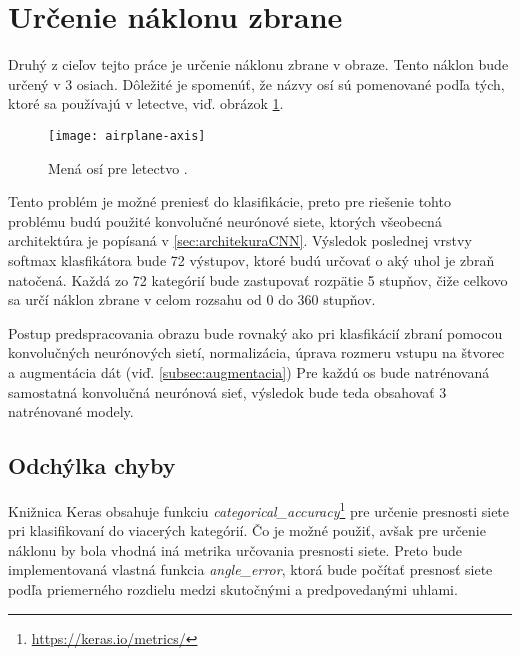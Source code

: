 
\section{Určenie náklonu zbrane}
\label{sec:urcenienaklonuzbrane}
Druhý z cieľov tejto práce je určenie náklonu zbrane v obraze.
Tento náklon bude určený v 3 osiach.
Dôležité je spomenúť, že názvy osí sú pomenované podľa tých, ktoré sa používajú v letectve, viď. obrázok \ref{pic:airplaneaxis}.
\begin{figure}[H]
    \centering
    \texttt{[image: airplane-axis]}
    \caption{Mená osí pre letectvo \cite{odkaz:airplaneaxis}.}
    \label{pic:airplaneaxis}
\end{figure}

Tento problém je možné preniesť do klasifikácie, preto pre riešenie tohto problému budú použité konvolučné neurónové siete, ktorých všeobecná architektúra je popísaná v \ref{sec:architekuraCNN}.
Výsledok poslednej vrstvy softmax klasfikátora bude 72 výstupov, ktoré budú určovať o aký uhol je zbraň natočená.
Každá zo 72 kategórií bude zastupovať rozpätie 5 stupňov, čiže celkovo sa určí náklon zbrane v celom rozsahu od 0 do 360 stupňov.

Postup predspracovania obrazu bude rovnaký ako pri klasfikácií zbraní pomocou konvolučných neurónových sietí, normalizácia, úprava rozmeru vstupu na štvorec a augmentácia dát (viď. \ref{subsec:augmentacia})
Pre každú os bude natrénovaná samostatná konvolučná neurónová sieť, výsledok bude teda obsahovať 3 natrénované modely.

\subsection{Odchýlka chyby}
\label{subsec:odchylkachyby}
Knižnica Keras obsahuje funkciu \textit{categorical\_accuracy}\footnote{\url{https://keras.io/metrics/}} pre určenie presnosti siete pri klasifikovaní do viacerých kategórií.
Čo je možné použiť, avšak pre určenie náklonu by bola vhodná iná metrika určovania presnosti siete.
Preto bude implementovaná vlastná funkcia \textit{angle\_error}, ktorá bude počítať presnosť siete podľa priemerného rozdielu medzi skutočnými a predpovedanými uhlami.

